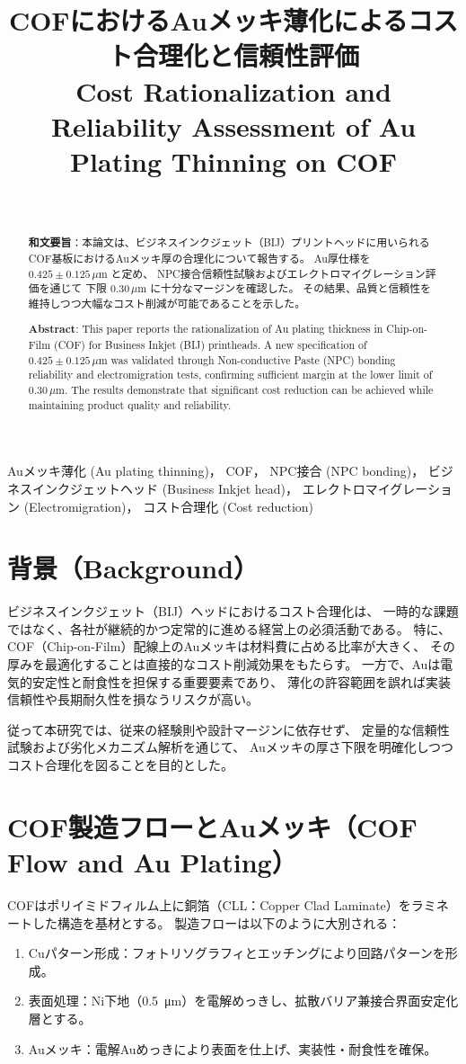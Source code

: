 \documentclass[conference]{IEEEtran}
\title{COFにおけるAuメッキ薄化によるコスト合理化と信頼性評価\\
\large Cost Rationalization and Reliability Assessment of Au Plating Thinning on COF}
\author{%
  \IEEEauthorblockN{三溝 真一（Shinichi Samizo)}\\
  \IEEEauthorblockA{独立系半導体研究者（元セイコーエプソン）\\
  Email: \href{mailto:shin3t72@gmail.com}{shin3t72@gmail.com}\\
  GitHub: \url{https://github.com/Samizo-AITL}}%
}
\begin{document}
\maketitle

\begin{abstract}
\textbf{和文要旨}：本論文は、ビジネスインクジェット（BIJ）プリントヘッドに用いられる
COF基板におけるAuメッキ厚の合理化について報告する。
Au厚仕様を $0.425 \pm 0.125\,\mu$m と定め、
NPC接合信頼性試験およびエレクトロマイグレーション評価を通じて
下限 $0.30\,\mu$m に十分なマージンを確認した。
その結果、品質と信頼性を維持しつつ大幅なコスト削減が可能であることを示した。

\medskip
\textbf{Abstract}: This paper reports the rationalization of Au plating thickness
in Chip-on-Film (COF) for Business Inkjet (BIJ) printheads.
A new specification of $0.425 \pm 0.125\,\mu$m was validated
through Non-conductive Paste (NPC) bonding reliability and electromigration tests,
confirming sufficient margin at the lower limit of $0.30\,\mu$m.
The results demonstrate that significant cost reduction can be achieved
while maintaining product quality and reliability.
\end{abstract}

\begin{IEEEkeywords}
Auメッキ薄化 (Au plating thinning)，
COF，
NPC接合 (NPC bonding)，
ビジネスインクジェットヘッド (Business Inkjet head)，
エレクトロマイグレーション (Electromigration)，
コスト合理化 (Cost reduction)
\end{IEEEkeywords}

\section{背景（Background）}
ビジネスインクジェット（BIJ）ヘッドにおけるコスト合理化は、
一時的な課題ではなく、各社が継続的かつ定常的に進める経営上の必須活動である。
特に、COF（Chip-on-Film）配線上のAuメッキは材料費に占める比率が大きく、
その厚みを最適化することは直接的なコスト削減効果をもたらす。
一方で、Auは電気的安定性と耐食性を担保する重要要素であり、
薄化の許容範囲を誤れば実装信頼性や長期耐久性を損なうリスクが高い。

従って本研究では、従来の経験則や設計マージンに依存せず、
定量的な信頼性試験および劣化メカニズム解析を通じて、
Auメッキの厚さ下限を明確化しつつコスト合理化を図ることを目的とした。

\section{COF製造フローとAuメッキ（COF Flow and Au Plating）}
COFはポリイミドフィルム上に銅箔（CLL：Copper Clad Laminate）をラミネートした構造を基材とする。
製造フローは以下のように大別される：
\begin{enumerate}
  \item Cuパターン形成：フォトリソグラフィとエッチングにより回路パターンを形成。
  \item 表面処理：Ni下地（\SI{0.5}{\micro\meter}）を電解めっきし、拡散バリア兼接合界面安定化層とする。
  \item Auメッキ：電解Auめっきにより表面を仕上げ、実装性・耐食性を確保。
\end{enumerate}
\end{document}
